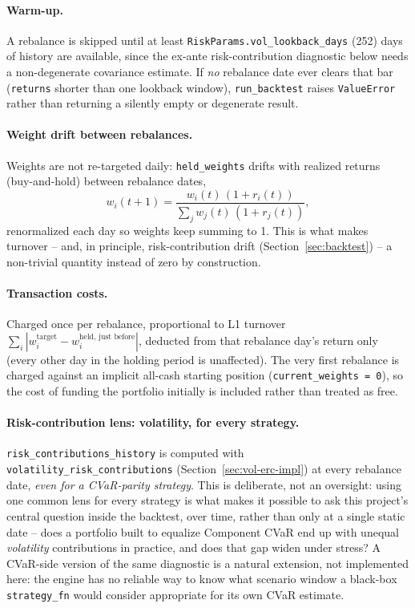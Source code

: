 \documentclass[11pt]{article}
\begin{document}
\paragraph{Warm-up.} A rebalance is skipped until at least
\texttt{RiskParams.vol\_lookback\_days} (252) days of history are
available, since the ex-ante risk-contribution diagnostic below needs a
non-degenerate covariance estimate. If \emph{no} rebalance date ever
clears that bar (\texttt{returns} shorter than one lookback window),
\texttt{run\_backtest} raises \texttt{ValueError} rather than returning
a silently empty or degenerate result.

\paragraph{Weight drift between rebalances.} Weights are not re-targeted
daily: \texttt{held\_weights} drifts with realized returns
(buy-and-hold) between rebalance dates,
\[
w_i(t+1) = \frac{w_i(t)\,(1 + r_i(t))}{\sum_j w_j(t)\,(1 + r_j(t))},
\]
renormalized each day so weights keep summing to 1. This is what makes
turnover -- and, in principle, risk-contribution drift
(Section~\ref{sec:backtest}) -- a non-trivial quantity instead of zero
by construction.

\paragraph{Transaction costs.} Charged once per rebalance, proportional
to L1 turnover $\sum_i |w_i^{\text{target}} - w_i^{\text{held, just
before}}|$, deducted from that rebalance day's return only (every other
day in the holding period is unaffected). The very first rebalance is
charged against an implicit all-cash starting position
(\texttt{current\_weights = 0}), so the cost of funding the portfolio
initially is included rather than treated as free.

\paragraph{Risk-contribution lens: volatility, for every strategy.}
\texttt{risk\_contributions\_history} is computed with
\texttt{volatility\_risk\_contributions} (Section~\ref{sec:vol-erc-impl})
at every rebalance date, \emph{even for a CVaR-parity strategy}. This is
deliberate, not an oversight: using one common lens for every strategy
is what makes it possible to ask this project's central question inside
the backtest, over time, rather than only at a single static date --
does a portfolio built to equalize Component CVaR end up with unequal
\emph{volatility} contributions in practice, and does that gap widen
under stress? A CVaR-side version of the same diagnostic is a natural
extension, not implemented here: the engine has no reliable way to know
what scenario window a black-box \texttt{strategy\_fn} would consider
appropriate for its own CVaR estimate.
\end{document}
